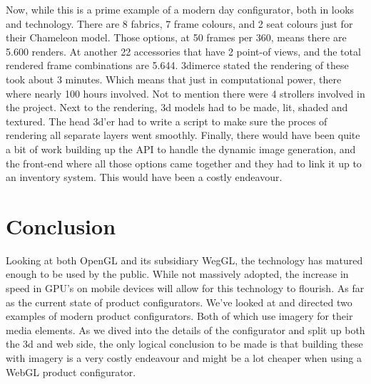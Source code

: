 Now, while this is a prime example of a modern day configurator, both in looks and technology. There are 8 fabrics, 7 frame colours, and 2 seat colours just for their Chameleon model. Those options, at 50 frames per 360, means there are 5.600 renders. At another 22 accessories that have 2 point-of views, and the total rendered frame combinations are 5.644. 3dimerce stated the rendering of these took about 3 minutes. Which means that just in computational power, there where nearly 100 hours involved. Not to mention there were 4 strollers involved in the project.
Next to the rendering, 3d models had to be made, lit, shaded and textured. The head 3d'er had to write a script to make sure the proces of rendering all separate layers went smoothly.
Finally, there would have been quite a bit of work building up the API to handle the dynamic image generation, and the front-end where all those options came together and they had to link it up to an inventory system.
This would have been a costly endeavour.

\section{Conclusion}
Looking at both OpenGL and its subsidiary WegGL, the technology has matured enough to be used by the public. While not massively adopted, the increase in speed in GPU's on mobile devices will allow for this technology to flourish.
As far as the current state of product configurators. We've looked at and directed two examples of modern product configurators. Both of which use imagery for their media elements. As we dived into the details of the configurator and split up both the 3d and web side, the only logical conclusion to be made is that building these with imagery is a very costly endeavour and might be a lot cheaper when using a WebGL product configurator.

\newpage